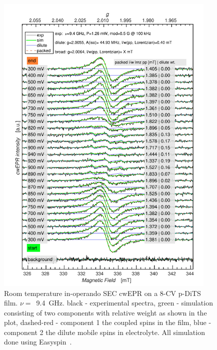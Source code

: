 \newpage
\begin{figure}[H]
\centering
\includegraphics[width=0.94\textwidth]{./operando_epr/figures/Figure_S4}
\caption{Room temperature in-operando SEC cwEPR on a 8-CV p-DiTS film. $\nu=$~9.4~GHz. black - experimental spectra, green - simulation consisting of two components with relative weight as shown in the plot, dashed-red - component 1 the coupled spins in the film, blue - component 2 the dilute mobile spins in electrolyte. All simulation done using Easyspin~\cite{Stoll2006}.}
\label{fig:S4}
\end{figure}

